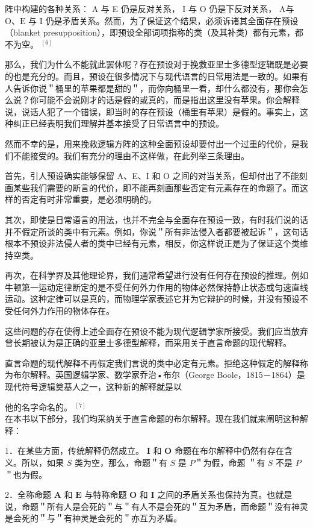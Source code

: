 阵中构建的各种关系： A 与 E 仍是反对关系， I 与 O 仍是下反对关系， A与 $\mathrm{O} 、 \mathrm{E}$ 与 I 仍是矛盾关系。然而，为了保证这个结果，必须诉诸其全面存在预设（blanket presupposition），即预设全部词项指称的类（及其补类）都有元素，都不为空。 ${ }^{[6]}$

那么，我们为什么不能就此罢休呢？存在预设对于挽救亚里士多德型逻辑既是必要的也是充分的。而且，预设在很多情况下与现代语言的日常用法是一致的。如果有人告诉你说＂桶里的苹果都是甜的＂，而你向桶里一看，却什么都没有，那你会怎么说？你可能不会说刚才的话是假的或真的，而是指出这里没有苹果。你会解释说，说话人犯了一个错误，即当时的存在预设（桶里有苹果）是假的。事实上，这种纠正已经表明我们理解并基本接受了日常语言中的预设。

然而不幸的是，用来挽救逻辑方阵的这种全面预设却要付出一个过重的代价，是我们不能接受的。我们有充分的理由不这样做，在此列举三条理由。

首先，引人预设确实能够保留 A、E、I 和 O 之间的对当关系，但却付出了不能刻画某些我们需要的断言的代价，即不能再刻画那些否定有元素存在的命题了。而这样的否定有时非常重要，是必须明确的。

其次，即使是日常语言的用法，也并不完全与全面存在预设一致，有时我们说的话并不假定所谈的类中有元素。例如，你说＂所有非法侵入者都要被起诉＂，这句话根本不预设非法侵人者的类中已经有元素，相反，你这样说正是为了保证这个类维持空类。

再次，在科学界及其他理论界，我们通常希望进行没有任何存在预设的推理。例如牛顿第一运动定律断定的是不受任何外力作用的物体必然保持静止状态或匀速直线运动。这种定律可以是真的，而物理学家表述它并为它辩护的时候，并没有预设不受任何外力作用的物体存在。

这些问题的存在使得上述全面存在预设不能为现代逻辑学家所接受。我们应当放弃曾长期被认为是正确的亚里士多德型解释，而采用关于直言命题的现代解释。

直言命题的现代解释不再假定我们言说的类中必定有元素。拒绝这种假定的解释称为布尔解释。英国逻辑学家、数学家乔治•布尔（George Boole，1815－1864）是现代符号逻辑奠基人之一，这种新的解释就是以

他的名字命名的。 ${ }^{[7]}$\\
在本书以下部分，我们均采纳关于直言命题的布尔解释。现在我们就来阐明这种解释：

1．在某些方面，传统解释仍然成立。 $\mathbf{I}$ 和 $\mathbf{O}$ 命题在布尔解释中仍然有存在含义。所以，如果 $S$ 类为空，那么，命题＂有 $S$ 是 $P$＂为假，命题 ＂有 $S$ 不是 $P$＂也为假。

2．全称命题 $\mathbf{A}$ 和 $\mathbf{E}$ 与特称命题 $\mathbf{O}$ 和 $\mathbf{I}$ 之间的矛盾关系也保持为真。也就是说，命题＂所有人是会死的＂与＂有人不是会死的＂互为矛盾，而命题＂没有神灵是会死的＂与＂有神灵是会死的＂亦互为矛盾。


